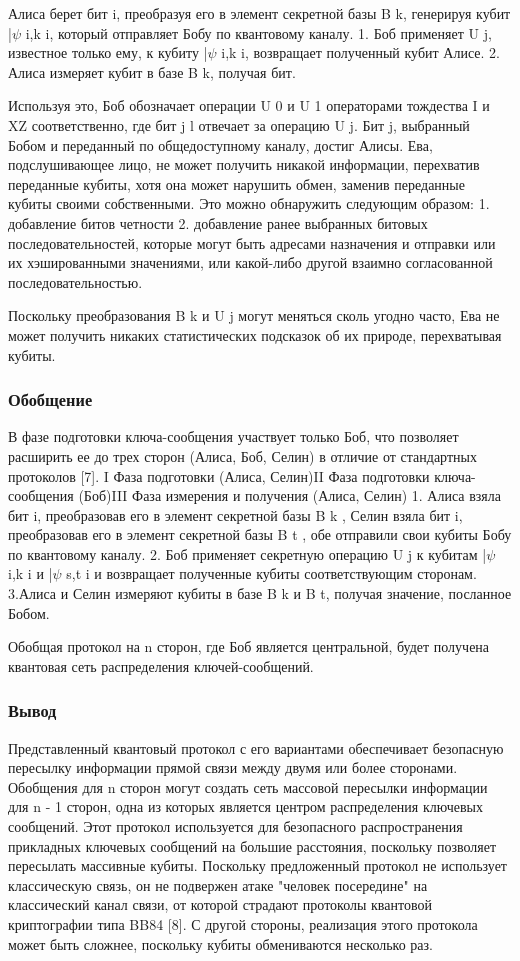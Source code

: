 Алиса берет бит i, преобразуя его в элемент секретной базы B k, генерируя кубит |$\psi$ i,k i, который отправляет Бобу по квантовому каналу.
1. Боб применяет U j, известное только ему, к кубиту |$\psi$ i,k i, возвращает полученный кубит Алисе.
2. Алиса измеряет кубит в базе B k, получая бит.

Используя это, Боб обозначает операции U 0 и U 1 операторами тождества I и XZ соответственно, где бит j l отвечает за операцию U j. Бит j, выбранный Бобом и переданный по общедоступному каналу, достиг Алисы. Ева, подслушивающее лицо, не может получить никакой информации, перехватив переданные кубиты, хотя она может нарушить обмен, заменив переданные кубиты своими собственными. Это можно обнаружить следующим образом:
1. добавление битов четности
2. добавление ранее выбранных битовых последовательностей, которые могут быть адресами назначения и отправки или их хэшированными значениями, или какой-либо другой взаимно согласованной последовательностью.

Поскольку преобразования B k и U j могут меняться сколь угодно часто, Ева не может получить никаких статистических подсказок об их природе, перехватывая кубиты.

\subsubsection{Обобщение}
В фазе подготовки ключа-сообщения участвует только Боб, что позволяет расширить ее до трех сторон (Алиса, Боб, Селин) в отличие от стандартных протоколов [7]. I Фаза подготовки (Алиса, Селин)II Фаза подготовки ключа-сообщения (Боб)III Фаза измерения и получения (Алиса, Селин)
1. Алиса взяла бит i, преобразовав его в элемент секретной базы B k , Селин взяла бит i, преобразовав его в элемент секретной базы B t , обе отправили свои кубиты Бобу по квантовому каналу.
2. Боб применяет секретную операцию U j к кубитам |$\psi$ i,k i и |$\psi$ s,t i и возвращает полученные кубиты соответствующим сторонам.
3.Алиса и Селин измеряют кубиты в базе B k и B t, получая значение, посланное Бобом.

Обобщая протокол на n сторон, где Боб является центральной, будет получена квантовая сеть распределения ключей-сообщений.

\subsubsection{Вывод}
Представленный квантовый протокол с его вариантами обеспечивает безопасную пересылку информации прямой связи между двумя или более сторонами. Обобщения для n сторон могут создать сеть массовой пересылки информации для n - 1 сторон, одна из которых является центром распределения ключевых сообщений. Этот протокол используется для безопасного распространения прикладных ключевых сообщений на большие расстояния, поскольку позволяет пересылать массивные кубиты. Поскольку предложенный протокол не использует классическую связь, он не подвержен атаке "человек посередине" на классический канал связи, от которой страдают протоколы квантовой криптографии типа BB84 [8]. С другой стороны, реализация этого протокола может быть сложнее, поскольку кубиты обмениваются несколько раз.

